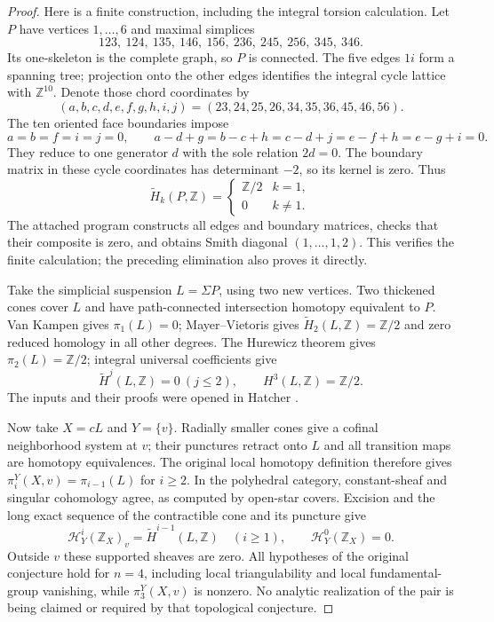 \begin{proof}
Here is a finite construction, including the integral torsion calculation. Let $P$ have vertices $1,\ldots,6$ and maximal simplices
\[
 123,\ 124,\ 135,\ 146,\ 156,\
 236,\ 245,\ 256,\ 345,\ 346.
\]
Its one-skeleton is the complete graph, so $P$ is connected. The five edges $1i$ form a spanning tree; projection onto the other edges identifies the integral cycle lattice with $\mathbb Z^{10}$. Denote those chord coordinates by
\[
 (a,b,c,d,e,f,g,h,i,j)=(23,24,25,26,34,35,36,45,46,56).
\]
The ten oriented face boundaries impose
\[
 a=b=f=i=j=0,\qquad
 a-d+g=b-c+h=c-d+j=e-f+h=e-g+i=0.
\]
They reduce to one generator $d$ with the sole relation $2d=0$. The boundary matrix in these cycle coordinates has determinant $-2$, so its kernel is zero. Thus
\[
 \widetilde H_k(P,\mathbb Z)=
 \begin{cases}\mathbb Z/2&k=1,\\0&k\ne1.\end{cases}
\]
The attached program constructs all edges and boundary matrices, checks that their composite is zero, and obtains Smith diagonal $(1,\ldots,1,2)$. This verifies the finite calculation; the preceding elimination also proves it directly.

Take the simplicial suspension $L=\Sigma P$, using two new vertices. Two thickened cones cover $L$ and have path-connected intersection homotopy equivalent to $P$. Van Kampen gives $\pi_1(L)=0$; Mayer--Vietoris gives
$\widetilde H_2(L,\mathbb Z)=\mathbb Z/2$ and zero reduced homology in all other degrees. The Hurewicz theorem gives $\pi_2(L)=\mathbb Z/2$; integral universal coefficients give
\[
 \widetilde H^j(L,\mathbb Z)=0\ (j\leq2),\qquad
 H^3(L,\mathbb Z)=\mathbb Z/2.
\]
The inputs and their proofs were opened in Hatcher \cite[Theorem 2.35, Example 2.40, Theorems 3.2 and 4.32]{BHatcher2002}.

Now take $X=cL$ and $Y=\{v\}$. Radially smaller cones give a cofinal neighborhood system at $v$; their punctures retract onto $L$ and all transition maps are homotopy equivalences. The original local homotopy definition therefore gives
$\pi_i^Y(X,v)=\pi_{i-1}(L)$ for $i\geq2$. In the polyhedral category, constant-sheaf and singular cohomology agree, as computed by open-star covers. Excision and the long exact sequence of the contractible cone and its puncture give
\[
 \mathcal H^i_Y(\mathbb Z_X)_v
   =\widetilde H^{i-1}(L,\mathbb Z)\quad(i\geq1),
 \qquad \mathcal H^0_Y(\mathbb Z_X)=0.
\]
Outside $v$ these supported sheaves are zero. All hypotheses of the original conjecture hold for $n=4$, including local triangulability and local fundamental-group vanishing, while $\pi_3^Y(X,v)$ is nonzero. No analytic realization of the pair is being claimed or required by that topological conjecture.


\end{proof}
